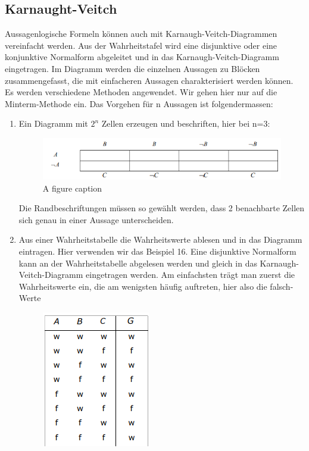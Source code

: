 \documentclass[../Main.tex]{subfiles}
\begin{document}
\subsection{Karnaught-Veitch}
Aussagenlogische Formeln können auch mit Karnaugh-Veitch-Diagrammen vereinfacht 
werden. Aus der Wahrheitstafel wird eine disjunktive oder eine konjunktive Normalform 
abgeleitet und in das Karnaugh-Veitch-Diagramm eingetragen. Im Diagramm werden die 
einzelnen Aussagen zu Blöcken zusammengefasst, die mit einfacheren Aussagen charakterisiert werden können. Es werden verschiedene Methoden angewendet. Wir gehen hier 
nur auf die Minterm-Methode ein.
Das Vorgehen für n Aussagen ist folgendermassen: 
\begin{enumerate}
    \item Ein Diagramm mit \(2^n\) Zellen erzeugen und beschriften, hier bei n=3:
    \begin{figure}[H]
        \centering
        \includegraphics[width = 1 \linewidth]{Images/kv-1.png}
        \caption{A figure caption}
    \end{figure}
    Die Randbeschriftungen müssen so gewählt werden, dass 2 benachbarte Zellen 
    sich genau in einer Aussage unterscheiden.
    \item Aus einer Wahrheitstabelle die Wahrheitswerte ablesen und in das Diagramm eintragen. Hier verwenden wir das Beispiel 16. Eine disjunktive Normalform kann an 
    der Wahrheitstabelle abgelesen werden und gleich in das Karnaugh-Veitch-Diagramm eingetragen werden. Am einfachsten trägt man zuerst die Wahrheitswerte 
    ein, die am wenigsten häufig auftreten, hier also die falsch-Werte
    \begin{figure}[H]
        \centering
        \includegraphics[width = .3 \linewidth]{Images/kv-2.png}

\end{figure}
\end{enumerate}
\end{document}
